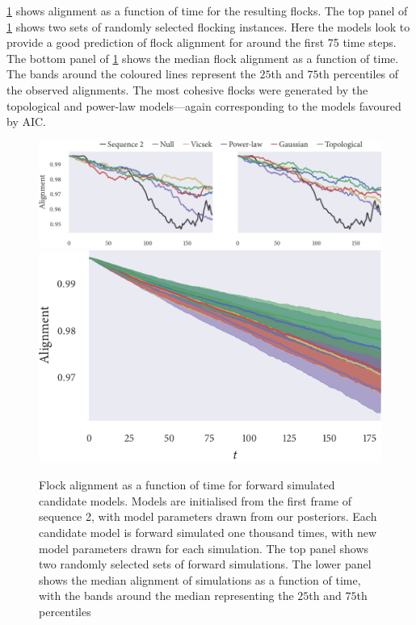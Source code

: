\cref{fig:checks_seq2} shows alignment as a function of time for the resulting
flocks. The top panel of \cref{fig:checks_seq2} shows two sets of randomly
selected flocking instances. Here the models look to provide a good prediction 
of flock alignment for around the first 75 time steps. The bottom panel of
\cref{fig:checks_seq2} shows the median flock alignment as a function of time.
The bands around the coloured lines represent the $25$th and $75$th
percentiles of the observed alignments. The most cohesive flocks were generated
by the topological and power-law models---again corresponding to the models
favoured by AIC.

\begin{figure}[tbp]
  \includegraphics{alignment/alignment_single_2.pdf}\vspace{1em}\\
  \includegraphics{alignment/alignment_ensemble_2.pdf}
  \caption{Flock alignment as a function of time for forward simulated
    candidate models. Models are initialised from the first frame of sequence
    2, with model parameters drawn from our posteriors. Each candidate
    model is forward simulated one thousand times, with new model parameters
    drawn for each simulation. The top panel shows two randomly selected sets
    of forward simulations. The lower panel shows the median alignment of
    simulations as a function of time, with the bands around the median
    representing the $25$th and $75$th percentiles}
  \label{fig:checks_seq2}
\end{figure}


